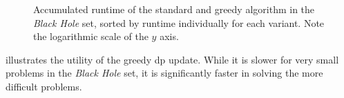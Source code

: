 \begin{figure}[tbp]
	\begin{figcenter}
	
	\end{figcenter}
	\caption{Accumulated runtime of the standard and greedy algorithm in the \emph{Black Hole} set, sorted by runtime individually for each variant. Note the logarithmic scale of the \(y\) axis.}
	\label{fig:cactus-greedy}
\end{figure}

 illustrates the utility of the greedy \gls{dp} update.
While it is slower for very small problems in the \emph{Black Hole} set, it is significantly faster in solving the more difficult problems.
